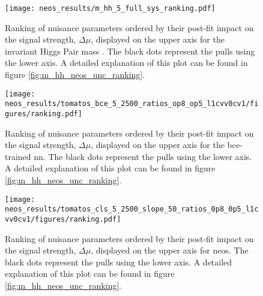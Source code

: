 

\begin{figure}
    \centering
    \texttt{[image: neos\_results/m\_hh\_5\_full\_sys\_ranking.pdf]}
    \caption[]{Ranking of nuisance parameters ordered by their post-fit impact on the signal strength, $\Delta\mu$, displayed on the upper axis for the invariant Higgs Pair mass \mhh{}. The black dots represent the pulls using the lower axis. A detailed explanation of this plot can be found in figure \ref{fig:m_hh_neos_unc_ranking}.}
    \label{fig:m_hh_full_sys_ranking}
\end{figure}
\begin{figure}
    \centering
    \texttt{[image: neos\_results/tomatos\_bce\_5\_2500\_ratios\_op8\_op5\_l1cvv0cv1/figures/ranking.pdf]}
    \caption[]{Ranking of nuisance parameters ordered by their post-fit impact on the signal strength, $\Delta\mu$, displayed on the upper axis for the \ac{bce}-trained \ac{nn}. The black dots represent the pulls using the lower axis. A detailed explanation of this plot can be found in figure \ref{fig:m_hh_neos_unc_ranking}.}
    \label{fig:bce_full_sys_ranking}
\end{figure}
\begin{figure}
    \centering
    \texttt{[image: neos\_results/tomatos\_cls\_5\_2500\_slope\_50\_ratios\_0p8\_0p5\_l1cvv0cv1/figures/ranking.pdf]}
    \caption[]{Ranking of nuisance parameters ordered by their post-fit impact on the signal strength, $\Delta\mu$, displayed on the upper axis for \ac{neos}. The black dots represent the pulls using the lower axis. A detailed explanation of this plot can be found in figure \ref{fig:m_hh_neos_unc_ranking}.}
    \label{fig:neos_full_sys_ranking}
\end{figure}